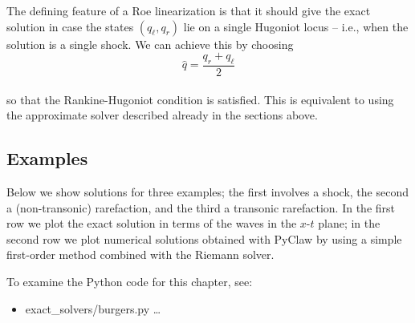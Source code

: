 \documentclass{SIAMbook2016}
\providecommand{\tightlist}{%
      \setlength{\itemsep}{0pt}\setlength{\parskip}{0pt}}
\begin{document}
The defining feature of a Roe linearization is that it should give the
exact solution in case the states \((q_\ell, q_r)\) lie on a single
Hugoniot locus -- i.e., when the solution is a single shock. We can
achieve this by choosing\\
\[\hat{q} = \frac{q_r + q_\ell}{2}\]\\
so that the Rankine-Hugoniot condition is satisfied. This is equivalent
to using the approximate solver described already in the sections above.

\hypertarget{examples}{%
\subsection{Examples}\label{examples}}

Below we show solutions for three examples; the first involves a shock,
the second a (non-transonic) rarefaction, and the third a transonic
rarefaction. In the first row we plot the exact solution in terms of the
waves in the \(x\)-\(t\) plane; in the second row we plot numerical
solutions obtained with PyClaw by using a simple first-order method
combined with the Riemann solver.

To examine the Python code for this chapter, see:

\begin{itemize}
\tightlist
\item
  {exact\_solvers/burgers.py} \ldots{}
\end{itemize}
\end{document}
